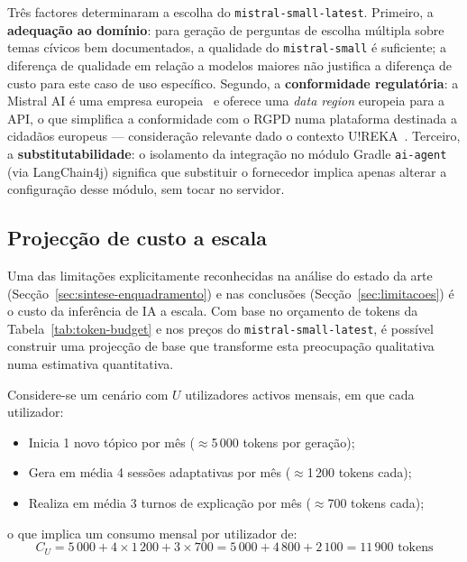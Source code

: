 Três factores determinaram a escolha do \texttt{mistral-small-latest}. Primeiro, a \textbf{adequação ao domínio}: para geração de perguntas de escolha múltipla sobre temas cívicos bem documentados, a qualidade do \texttt{mistral-small} é suficiente; a diferença de qualidade em relação a modelos maiores não justifica a diferença de custo para este caso de uso específico. Segundo, a \textbf{conformidade regulatória}: a Mistral AI é uma empresa europeia~\cite{jiang2023mistral} e oferece uma \emph{data region} europeia para a API, o que simplifica a conformidade com o RGPD numa plataforma destinada a cidadãos europeus --- consideração relevante dado o contexto U!REKA~\citep{ureka2026alliance}. Terceiro, a \textbf{substitutabilidade}: o isolamento da integração no módulo Gradle \texttt{ai-agent} (via LangChain4j) significa que substituir o fornecedor implica apenas alterar a configuração desse módulo, sem tocar no servidor.

\subsection{Projecção de custo a escala}
\label{ssec:custo-escala}

Uma das limitações explicitamente reconhecidas na análise do estado da arte (Secção~\ref{sec:sintese-enquadramento}) e nas conclusões (Secção~\ref{sec:limitacoes}) é o custo da inferência de IA a escala. Com base no orçamento de tokens da Tabela~\ref{tab:token-budget} e nos preços do \texttt{mistral-small-latest}, é possível construir uma projecção de base que transforme esta preocupação qualitativa numa estimativa quantitativa.

Considere-se um cenário com $U$ utilizadores activos mensais, em que cada utilizador:
\begin{itemize}
    \item Inicia 1 novo tópico por mês ($\approx$5\,000 tokens por geração);
    \item Gera em média 4 sessões adaptativas por mês ($\approx$1\,200 tokens cada);
    \item Realiza em média 3 turnos de explicação por mês ($\approx$700 tokens cada);
\end{itemize}
o que implica um consumo mensal por utilizador de:
\[
    C_U = 5\,000 + 4 \times 1\,200 + 3 \times 700 = 5\,000 + 4\,800 + 2\,100 = 11\,900 \text{ tokens}
\]


